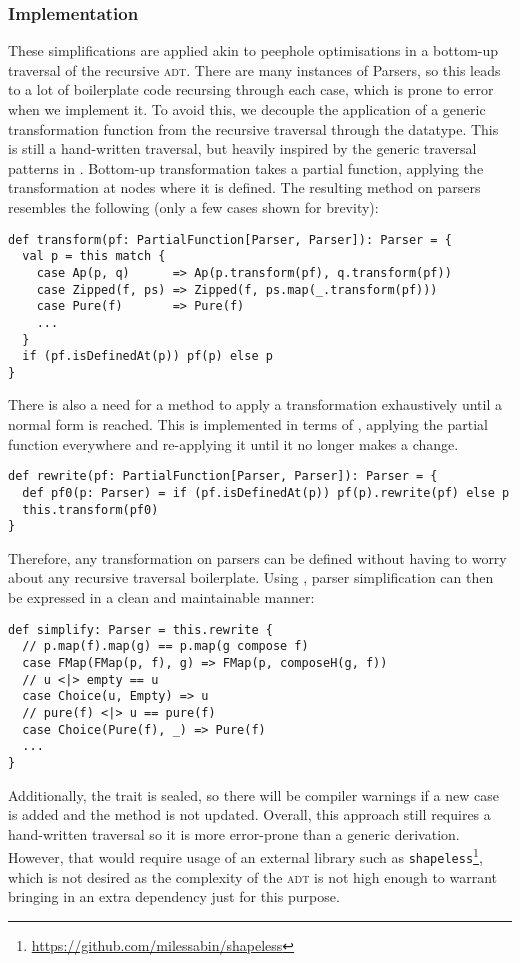 \documentclass[../../main.tex]{subfiles}
\begin{document}
\subsubsection{Implementation}
These simplifications are applied akin to peephole optimisations in a bottom-up traversal of the recursive  \textsc{adt}.
There are many instances of Parsers, so this leads to a lot of boilerplate code recursing through each case, which is prone to error when we implement it.
To avoid this, we decouple the application of a generic transformation function from the recursive traversal through the datatype.
This is still a hand-written traversal, but heavily inspired by the generic traversal patterns in \cite{mitchell_uniform_2007}.
Bottom-up transformation takes a partial function, applying the transformation at nodes where it is defined.
The resulting  method on parsers resembles the following (only a few cases shown for brevity):
\begin{verbatim}
def transform(pf: PartialFunction[Parser, Parser]): Parser = {
  val p = this match {
    case Ap(p, q)      => Ap(p.transform(pf), q.transform(pf))
    case Zipped(f, ps) => Zipped(f, ps.map(_.transform(pf)))
    case Pure(f)       => Pure(f)
    ...
  }
  if (pf.isDefinedAt(p)) pf(p) else p
}
\end{verbatim}
%
There is also a need for a  method to apply a transformation exhaustively until a normal form is reached.
This is implemented in terms of , applying the partial function everywhere and re-applying it until it no longer makes a change.
\begin{verbatim}
def rewrite(pf: PartialFunction[Parser, Parser]): Parser = {
  def pf0(p: Parser) = if (pf.isDefinedAt(p)) pf(p).rewrite(pf) else p
  this.transform(pf0)
}
\end{verbatim}
%
Therefore, any transformation on parsers can be defined without having to worry about any recursive traversal boilerplate.
Using , parser simplification can then be expressed in a clean and maintainable manner:
\begin{verbatim}
def simplify: Parser = this.rewrite {
  // p.map(f).map(g) == p.map(g compose f)
  case FMap(FMap(p, f), g) => FMap(p, composeH(g, f))
  // u <|> empty == u
  case Choice(u, Empty) => u
  // pure(f) <|> u == pure(f)
  case Choice(Pure(f), _) => Pure(f)
  ...
}
\end{verbatim}
%
Additionally, the  trait is sealed, so there will be compiler warnings if a new case is added and the  method is not updated.
Overall, this approach still requires a hand-written traversal so it is more error-prone than a generic derivation.
However, that would require usage of an external library such as \texttt{shapeless}\footnote{\url{https://github.com/milessabin/shapeless}},
which is not desired as the complexity of the \textsc{adt} is not high enough to warrant bringing in an extra dependency just for this purpose.
\end{document}
